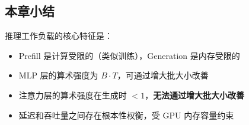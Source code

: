 \subsection{本章小结}

推理工作负载的核心特征是：
\begin{itemize}
    \item Prefill 是计算受限的（类似训练），Generation 是内存受限的
    \item MLP 层的算术强度为 $B \cdot T$，可通过增大批大小改善
    \item 注意力层的算术强度在生成时 $<1$，\textbf{无法通过增大批大小改善}
    \item 延迟和吞吐量之间存在根本性权衡，受 GPU 内存容量约束
\end{itemize}


